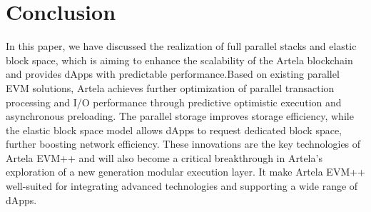 \section{Conclusion}

In this paper, we have discussed the realization of full parallel stacks and elastic block space, which is aiming to enhance the scalability of the Artela blockchain and provides dApps with predictable performance.Based on existing parallel EVM solutions, Artela achieves further optimization of parallel transaction processing and I/O performance through predictive optimistic execution and asynchronous preloading. The parallel storage improves storage efficiency, while the elastic block space model allows dApps to request dedicated block space, further boosting network efficiency. These innovations are the key technologies of Artela EVM++ and will also become a critical breakthrough in Artela's exploration of a new generation modular execution layer. It make Artela EVM++ well-suited for integrating advanced technologies and supporting a wide range of dApps.